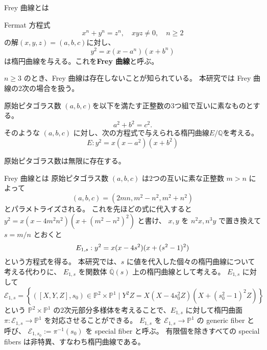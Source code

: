 \documentclass{classes/mybeamer}
\begin{document}
\begin{frame}{Frey 曲線とは}
    \begin{dfn*}
        Fermat 方程式
        \begin{equation}
            x^n + y^n = z^n, \quad xyz \neq 0, \quad n \geq 2
        \end{equation}
        の解$(x, y, z)=(a,b,c)$に対し、
        \begin{equation}
            y^2 = x (x-a^n) (x+b^n)
        \end{equation}
        は楕円曲線を与える。これを\color{blue}\textbf{Frey 曲線}\color{black}と呼ぶ。
    \end{dfn*}
    $n\geq 3$ のとき、Frey 曲線は存在しないことが知られている。
    本研究では Frey 曲線の$2$次の場合を扱う。
    \begin{dfn*}
        原始ピタゴラス数 $(a,b,c)$を以下を満たす正整数の$3$つ組で互いに素なものとする。
        \begin{equation}
            \label{eq:pythagorean_triple}
            a^2+b^2=c^2.
        \end{equation}
        そのような $(a,b,c)$ に対し、次の方程式で与えられる楕円曲線$E/\mathbb{Q}$を考える。
        \begin{equation}
            \label{eq:2frey}
            E: y^2 = x (x-a^2) (x+b^2)
        \end{equation}
    \end{dfn*}
    原始ピタゴラス数は無限に存在する。
\end{frame}

\begin{frame}{Frey 曲線とは}
    原始ピタゴラス数 $(a,b,c)$ は$2$つの互いに素な正整数 $m > n$ によって
    \begin{equation*}
        (a,b,c) = (2mn, m^{2} - n^{2}, m^{2} + n^{2})
    \end{equation*}
    とパラメトライズされる。
    これを先ほどの式に代入すると $y^{2} = x(x - 4m^2n^2)(x + (m^{2} - n^2)^{2})$ と書け、
    $x,y$ を $n^2x, n^3y$ で置き換えて $s = m/n$ とおくと
    \begin{equation*}
        \label{eq:E_{1,s}}
        E_{1,s}: y^{2} = x(x - 4s^{2})(x + (s^{2} - 1)^{2})
    \end{equation*}
    という方程式を得る。
    本研究では、$s$ に値を代入した個々の楕円曲線について考える代わりに、 $E_{1,s}$ を関数体 $\overline{\mathbb{Q}}(s)$ 上の楕円曲線として考える。
    $E_{1,s}$ に対して
    \begin{equation*}
        \mathcal{E}_{1,s} = \left\{ ([X,Y,Z],s_0) \in \mathbb{P}^{2} \times \mathbb{P}^{1} \mid Y^{2}Z = X(X - 4s_{0}^{2}Z)(X + (s_{0}^{2} - 1)^{2}Z) \right\}
    \end{equation*}
    という $\mathbb{P}^{2} \times \mathbb{P}^{1}$ の$2$次元部分多様体を考えることで、$E_{1,s}$ に対して楕円曲面 $\pi: \mathcal{E}_{1,s}\to \mathbb{P}^{1}$ を対応させることができる。
    $E_{1,s}$ を $\mathcal{E}_{1,s} \to \mathbb{P}^{1}$ の generic fiber と呼び、 $\mathcal{E}_{1,s_0}:=\pi^{-1}(s_0)$ を special fiber と呼ぶ。
    有限個を除きすべての special fibers は非特異、すなわち楕円曲線である。
\end{frame}
\end{document}
